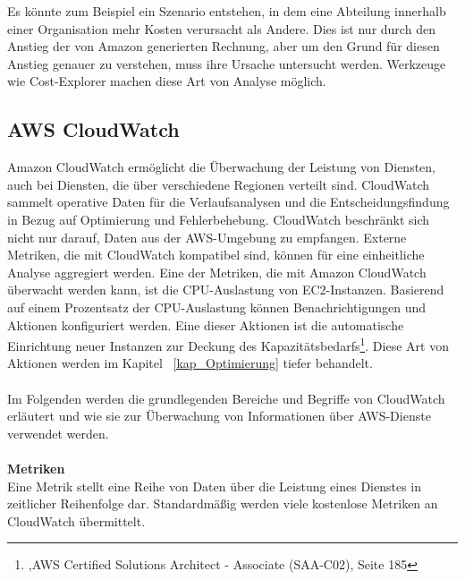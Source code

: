 Es könnte zum Beispiel ein Szenario entstehen, in dem eine Abteilung innerhalb einer Organisation mehr Kosten verursacht als Andere. Dies ist nur durch den Anstieg der von Amazon generierten Rechnung, aber um den Grund für diesen Anstieg genauer zu verstehen, muss ihre Ursache untersucht werden. Werkzeuge wie Cost-Explorer machen diese Art von Analyse möglich.


\subsection{AWS CloudWatch}
Amazon CloudWatch ermöglicht die Überwachung der Leistung von Diensten, auch bei Diensten, die über verschiedene Regionen verteilt sind. CloudWatch sammelt operative Daten für die Verlaufsanalysen und die Entscheidungsfindung in Bezug auf Optimierung und Fehlerbehebung. CloudWatch beschränkt sich nicht nur darauf, Daten aus der AWS-Umgebung zu empfangen. Externe Metriken, die mit CloudWatch kompatibel sind, können für eine einheitliche Analyse aggregiert werden. Eine der Metriken, die mit Amazon CloudWatch überwacht werden kann, ist die CPU-Auslastung von EC2-Instanzen. Basierend auf einem Prozentsatz der CPU-Auslastung können Benachrichtigungen und Aktionen konfiguriert werden. Eine dieser Aktionen ist die automatische Einrichtung neuer Instanzen zur Deckung des Kapazitätsbedarfs\footnote{\cite{AWS1},AWS Certified Solutions Architect - Associate (SAA-C02), Seite 185}. Diese Art von Aktionen werden im Kapitel ~\ref{kap_Optimierung} tiefer behandelt.
\\\\
Im Folgenden werden die grundlegenden Bereiche und Begriffe von CloudWatch erläutert und wie sie zur Überwachung von Informationen über AWS-Dienste verwendet werden.
\\\\
\textbf{Metriken} \\
Eine Metrik stellt eine Reihe von Daten über die Leistung eines Dienstes in zeitlicher Reihenfolge dar. Standardmäßig werden viele kostenlose Metriken an CloudWatch übermittelt.
